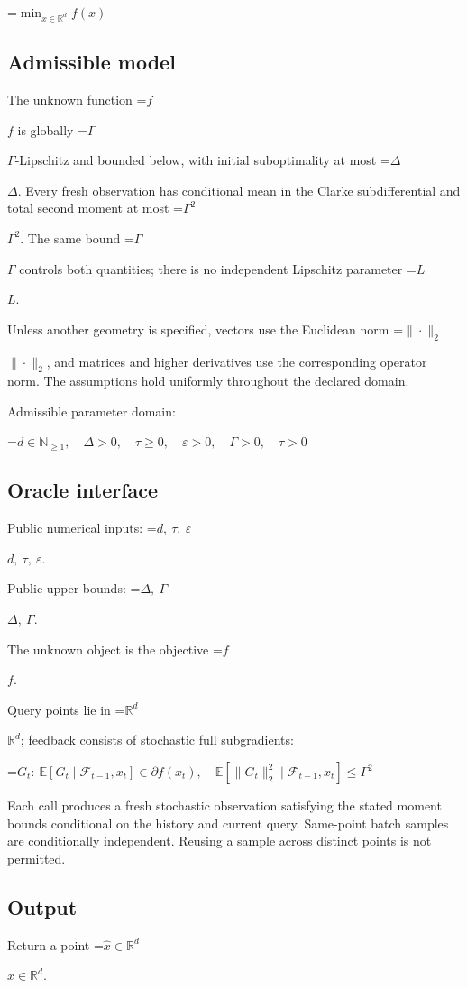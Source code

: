 \documentclass[10pt,a4paper]{article}
\newcommand{\AtlasMath}[1]{\par\begingroup\centering\setbox0=\hbox{$\displaystyle #1$}\ifdim\wd0>1.4\linewidth\typeout{ATLAS WIDE FORMULA: \the\wd0}\fi\ifdim\wd0>\linewidth\resizebox{\linewidth}{!}{\box0}\else\box0\fi\par\endgroup}
\newcommand{\AtlasInlineMath}[1]{\begingroup\setbox0=\hbox{$#1$}\ifdim\wd0>.4\linewidth\endgroup\AtlasMath{#1}\else\endgroup$#1$\fi}
\begin{document}
\AtlasMath{\min_{x\in \mathbb{R}^d}f(x)}


\subsection{Admissible model}
The unknown function \AtlasInlineMath{f} is globally \AtlasInlineMath{\Gamma}-Lipschitz and bounded below, with initial suboptimality at most \AtlasInlineMath{\Delta}. Every fresh observation has conditional mean in the Clarke subdifferential and total second moment at most \AtlasInlineMath{\Gamma^2}. The same bound \AtlasInlineMath{\Gamma} controls both quantities; there is no independent Lipschitz parameter \AtlasInlineMath{L}.

Unless another geometry is specified, vectors use the Euclidean norm \AtlasInlineMath{\|\cdot\|_2}, and matrices and higher derivatives use the corresponding operator norm. The assumptions hold uniformly throughout the declared domain.

Admissible parameter domain:


\AtlasMath{d\in\mathbb{N}_{\ge1},\quad \Delta>0,\quad \tau\ge0,\quad \varepsilon>0,\quad \Gamma>0,\quad \tau>0}


\subsection{Oracle interface}
Public numerical inputs: \AtlasInlineMath{d,\ \tau,\ \varepsilon}.

Public upper bounds: \AtlasInlineMath{\Delta,\ \Gamma}.

The unknown object is the objective \AtlasInlineMath{f}.

Query points lie in \AtlasInlineMath{\mathbb{R}^d}; feedback consists of stochastic full subgradients:


\AtlasMath{G_t:\ \mathbb{E}[G_t\mid\mathcal{F}_{t-1},x_t]\in\partial f(x_t),\quad\mathbb{E}[\|G_t\|_2^2\mid\mathcal{F}_{t-1},x_t]\le\Gamma^2}


Each call produces a fresh stochastic observation satisfying the stated moment bounds conditional on the history and current query. Same-point batch samples are conditionally independent. Reusing a sample across distinct points is not permitted.

\subsection{Output}
Return a point \AtlasInlineMath{\widehat x\in\mathbb R^d}.
\end{document}
